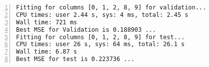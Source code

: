 \begin{lstlisting}[language={},numbers=left,numberstyle=\tiny,frame = single]
Fitting for columns [0, 1, 2, 8, 9] for validation...
CPU times: user 2.44 s, sys: 4 ms, total: 2.45 s
Wall time: 721 ms
Best MSE for Validation is 0.188903 ...
Fitting for columns [0, 1, 2, 8, 9] for test...
CPU times: user 26 s, sys: 64 ms, total: 26.1 s
Wall time: 6.87 s
Best MSE for test is 0.223736 ...
\end{lstlisting}